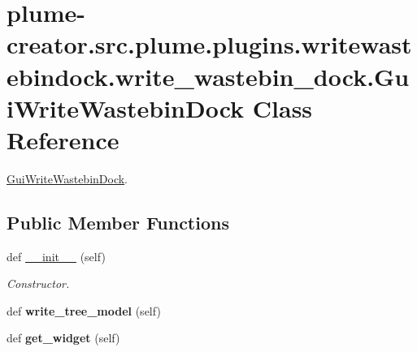 \hypertarget{classplume-creator_1_1src_1_1plume_1_1plugins_1_1writewastebindock_1_1write__wastebin__dock_1_1_gui_write_wastebin_dock}{}\section{plume-\/creator.src.\+plume.\+plugins.\+writewastebindock.\+write\+\_\+wastebin\+\_\+dock.\+Gui\+Write\+Wastebin\+Dock Class Reference}
\label{classplume-creator_1_1src_1_1plume_1_1plugins_1_1writewastebindock_1_1write__wastebin__dock_1_1_gui_write_wastebin_dock}


\hyperlink{classplume-creator_1_1src_1_1plume_1_1plugins_1_1writewastebindock_1_1write__wastebin__dock_1_1_gui_write_wastebin_dock}{Gui\+Write\+Wastebin\+Dock}.  


\subsection*{Public Member Functions}
\begin{DoxyCompactItemize}
\item 
def \hyperlink{classplume-creator_1_1src_1_1plume_1_1plugins_1_1writewastebindock_1_1write__wastebin__dock_1_1_gui_write_wastebin_dock_a0b86a434090e9efd07012ca25d2983b1}{\+\_\+\+\_\+init\+\_\+\+\_\+} (self)\hypertarget{classplume-creator_1_1src_1_1plume_1_1plugins_1_1writewastebindock_1_1write__wastebin__dock_1_1_gui_write_wastebin_dock_a0b86a434090e9efd07012ca25d2983b1}{}\label{classplume-creator_1_1src_1_1plume_1_1plugins_1_1writewastebindock_1_1write__wastebin__dock_1_1_gui_write_wastebin_dock_a0b86a434090e9efd07012ca25d2983b1}

\begin{DoxyCompactList}\small\item\em Constructor. \end{DoxyCompactList}\item 
def {\bfseries write\+\_\+tree\+\_\+model} (self)\hypertarget{classplume-creator_1_1src_1_1plume_1_1plugins_1_1writewastebindock_1_1write__wastebin__dock_1_1_gui_write_wastebin_dock_a51ae6fb51db8acbda0c96830596579c2}{}\label{classplume-creator_1_1src_1_1plume_1_1plugins_1_1writewastebindock_1_1write__wastebin__dock_1_1_gui_write_wastebin_dock_a51ae6fb51db8acbda0c96830596579c2}

\item 
def {\bfseries get\+\_\+widget} (self)\hypertarget{classplume-creator_1_1src_1_1plume_1_1plugins_1_1writewastebindock_1_1write__wastebin__dock_1_1_gui_write_wastebin_dock_ab5643de2874991769edca552da1f969e}{}\label{classplume-creator_1_1src_1_1plume_1_1plugins_1_1writewastebindock_1_1write__wastebin__dock_1_1_gui_write_wastebin_dock_ab5643de2874991769edca552da1f969e}

\end{DoxyCompactItemize}
